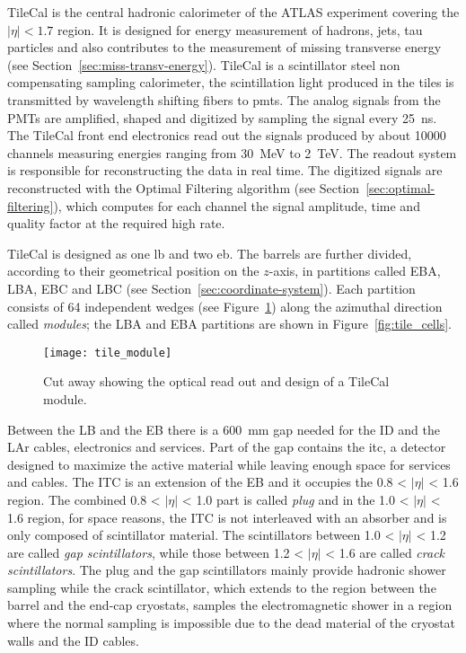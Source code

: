TileCal is the central hadronic calorimeter of the ATLAS experiment covering the
$|\eta| < 1.7$ region. It is designed for energy measurement of hadrons, jets,
tau particles and also contributes to the measurement of missing transverse
energy (see Section~\ref{sec:miss-transv-energy}). TileCal is a scintillator
steel non compensating sampling calorimeter, the scintillation light produced in
the tiles is transmitted by wavelength shifting fibers to \glspl{pmt}. The
analog signals from the PMTs are amplified, shaped and digitized by sampling the
signal every 25~ns. The TileCal front end electronics read out the signals
produced by about 10000 channels measuring energies ranging from 30~MeV to
2~TeV. The readout system is responsible for reconstructing the data in real
time. The digitized signals are reconstructed with the Optimal Filtering
algorithm (see Section~\ref{sec:optimal-filtering}), which computes for each
channel the signal amplitude, time and quality factor at the required high rate.

TileCal is designed as one \gls{lb} and two \gls{eb}. The barrels are further
divided, according to their geometrical position on the $z$-axis, in partitions
called EBA, LBA, EBC and LBC (see Section~\ref{sec:coordinate-system}). Each
partition consists of 64 independent wedges (see Figure~\ref{fig:tile_mod})
along the azimuthal direction called \emph{modules}; the LBA and EBA partitions
are shown in Figure~\ref{fig:tile_cells}.

\begin{figure}[!h]
  \centering
    \texttt{[image: tile\_module]}
    \caption{Cut away showing the optical read out and design of a TileCal
      module.}
    \label{fig:tile_mod}
\end{figure}

Between the LB and the EB there is a 600~mm gap needed for the ID and the LAr
cables, electronics and services. Part of the gap contains the \gls{itc}, a
detector designed to maximize the active material while leaving enough space for
services and cables. The ITC is an extension of the EB and it occupies the 0.8 <
$|\eta|$ < 1.6 region. The combined 0.8 < $|\eta|$ < 1.0 part is called
\emph{plug} and in the 1.0 < $|\eta|$ < 1.6 region, for space reasons, the ITC
is not interleaved with an absorber and is only composed of scintillator
material. The scintillators between 1.0 < $|\eta|$ < 1.2 are called \emph{gap
  scintillators}, while those between 1.2 < $|\eta|$ < 1.6 are called
\emph{crack scintillators}. The plug and the gap scintillators mainly provide
hadronic shower sampling while the crack scintillator, which extends to the
region between the barrel and the end-cap cryostats, samples the electromagnetic
shower in a region where the normal sampling is impossible due to the dead
material of the cryostat walls and the ID cables.

